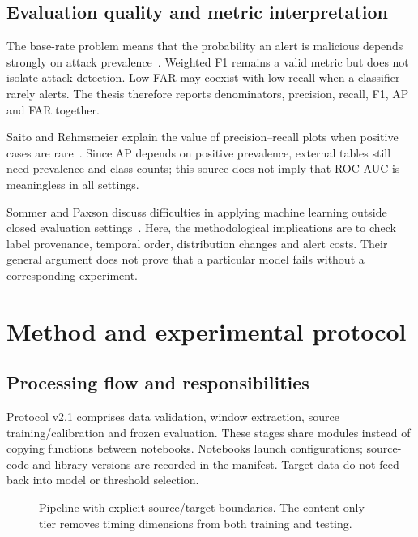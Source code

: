 \documentclass[12pt,a4paper,oneside,openany]{extbook}
\begin{document}
\section{Evaluation quality and metric interpretation}
The base-rate problem means that the probability an alert is malicious depends strongly on attack prevalence~\cite{axelsson2000base}. Weighted F1 remains a valid metric but does not isolate attack detection. Low FAR may coexist with low recall when a classifier rarely alerts. The thesis therefore reports denominators, precision, recall, F1, AP and FAR together.

Saito and Rehmsmeier explain the value of precision--recall plots when positive cases are rare~\cite{saito2015pr}. Since AP depends on positive prevalence, external tables still need prevalence and class counts; this source does not imply that ROC-AUC is meaningless in all settings.

Sommer and Paxson discuss difficulties in applying machine learning outside closed evaluation settings~\cite{sommer2010outside}. Here, the methodological implications are to check label provenance, temporal order, distribution changes and alert costs. Their general argument does not prove that a particular model fails without a corresponding experiment.

\chapter{Method and experimental protocol}\label{chap:method}
\section{Processing flow and responsibilities}
Protocol v2.1 comprises data validation, window extraction, source training/calibration and frozen evaluation. These stages share modules instead of copying functions between notebooks. Notebooks launch configurations; source-code and library versions are recorded in the manifest. Target data do not feed back into model or threshold selection.

\begin{figure}[htbp]\centering
{}
\caption{Pipeline with explicit source/target boundaries. The content-only tier removes timing dimensions from both training and testing.}\label{fig:pipeline}
\end{figure}
\end{document}
